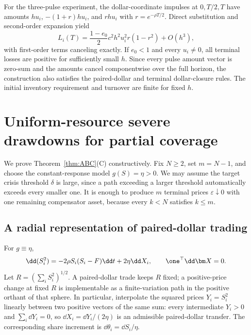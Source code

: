 \documentclass[review,hidelinks,onefignum,onetabnum]{siamonline250211}
\begin{document}
For the three-pulse experiment, the dollar-coordinate impulses at $0,T/2,T$ have amounts $hu_i$, $-(1+r)hu_i$, and $rhu_i$ with $r=e^{-\rho T/2}$. Direct substitution and second-order expansion yield
\begin{equation}\label{eq:local-three}
L_i(T)=\frac{1-e_0}{2}c^2h^2u_i^2r(1-r^2)+O(h^3),
\end{equation}
with first-order terms canceling exactly. If $e_0<1$ and every $u_i\ne0$, all terminal losses are positive for sufficiently small $h$. Since every pulse amount vector is zero-sum and the amounts cancel componentwise over the full horizon, the construction also satisfies the paired-dollar and terminal dollar-closure rules. The initial inventory requirement and turnover are finite for fixed $h$.

\section{Uniform-resource severe drawdowns for partial coverage}\label{app:severe}
We prove Theorem~\ref{thm:ABC}(C) constructively. Fix $N\ge2$, set $m=N-1$, and choose the constant-response model $g(S)=\eta>0$. We may assume the target crisis threshold $\delta$ is large, since a path exceeding a larger threshold automatically exceeds every smaller one. It is enough to produce $m$ terminal prices $\varepsilon\downarrow0$ with one remaining compensator asset, because every $k<N$ satisfies $k\le m$.

\subsection{A radial representation of paired-dollar trading}
For $g\equiv\eta$,
\begin{equation}\label{eq:radius-appendix}
\dd(S_i^2)= -2\rho S_i(S_i-F)\dd t+2\eta\dd X_i,
\qquad \one^\top\dd\bm X=0.
\end{equation}
Let $R=(\sum_iS_i^2)^{1/2}$. A paired-dollar trade keeps $R$ fixed; a positive-price change at fixed $R$ is implementable as a finite-variation path in the positive orthant of that sphere. In particular, interpolate the squared prices $Y_i=S_i^2$ linearly between two positive vectors of the same sum: every intermediate $Y_i>0$ and $\sum_i\dd Y_i=0$, so $\dd X_i=\dd Y_i/(2\eta)$ is an admissible paired-dollar transfer. The corresponding share increment is $\dd\theta_i=\dd S_i/\eta$.
\end{document}
